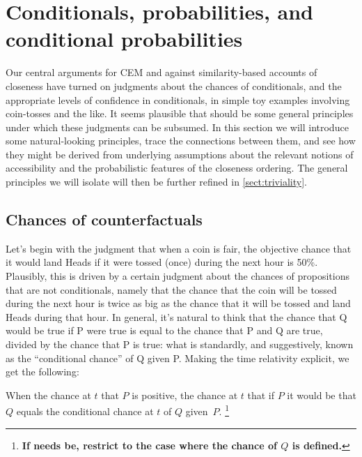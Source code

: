\documentclass[If.tex]{subfiles}
\begin{document}
\chapter{Conditionals, probabilities, and conditional probabilities}
\label{sect:equations}
Our central arguments for CEM and against similarity-based accounts of closeness have turned on judgments about the chances of conditionals, and the appropriate levels of confidence in conditionals, in simple toy examples involving coin-tosses and the like. It seems plausible that should be some general principles under which these judgments can be subsumed. In this section we will introduce some natural-looking principles, trace the connections between them, and see how they might be derived from underlying assumptions about the relevant notions of accessibility and the probabilistic features of the closeness ordering. The general principles we will isolate will then be further refined in \autoref{sect:triviality}.

\section{Chances of counterfactuals}\label{sect:chance}
Let's begin with the judgment that when a coin is fair, the objective chance that it would land Heads if it were tossed (once) during the next hour is 50\%. Plausibly, this is driven by a certain judgment about the chances of propositions that are not conditionals, namely that the chance that the coin will be tossed during the next hour is twice as big as the chance that it will be tossed and land Heads during that hour. In general, it's natural to think that the chance that Q would be true if P were true is equal to the chance that P and Q are true, divided by the chance that P is true: what is standardly, and suggestively, known as the “conditional chance” of Q given P. Making the time relativity explicit, we get the following:
\begin{prop}
	 \label{chanceq}
	When the chance at $t$ that $P$ is positive, the chance at $t$ that if $P$ it would be that $Q$ equals the conditional chance at $t$ of $Q$ given~$P$.%
	\footnote{\textbf{If needs be, restrict to the case where the chance of $Q$ is defined.}}
\end{prop}
\end{document}
